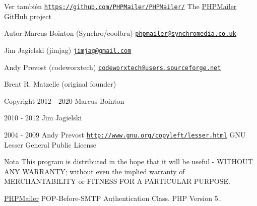 \begin{DoxySeeAlso}{Ver también}
\href{https://github.com/PHPMailer/PHPMailer/}{\tt https\+://github.\+com/\+P\+H\+P\+Mailer/\+P\+H\+P\+Mailer/} The \hyperlink{classPHPMailer_1_1PHPMailer_1_1PHPMailer}{P\+H\+P\+Mailer} Git\+Hub project
\end{DoxySeeAlso}
\begin{DoxyAuthor}{Autor}
Marcus Bointon (Synchro/coolbru) \href{mailto:phpmailer@synchromedia.co.uk}{\tt phpmailer@synchromedia.\+co.\+uk} 

Jim Jagielski (jimjag) \href{mailto:jimjag@gmail.com}{\tt jimjag@gmail.\+com} 

Andy Prevost (codeworxtech) \href{mailto:codeworxtech@users.sourceforge.net}{\tt codeworxtech@users.\+sourceforge.\+net} 

Brent R. Matzelle (original founder) 
\end{DoxyAuthor}
\begin{DoxyCopyright}{Copyright}
2012 -\/ 2020 Marcus Bointon 

2010 -\/ 2012 Jim Jagielski 

2004 -\/ 2009 Andy Prevost  \href{http://www.gnu.org/copyleft/lesser.html}{\tt http\+://www.\+gnu.\+org/copyleft/lesser.\+html} G\+NU Lesser General Public License 
\end{DoxyCopyright}
\begin{DoxyNote}{Nota}
This program is distributed in the hope that it will be useful -\/ W\+I\+T\+H\+O\+UT A\+NY W\+A\+R\+R\+A\+N\+TY; without even the implied warranty of M\+E\+R\+C\+H\+A\+N\+T\+A\+B\+I\+L\+I\+TY or F\+I\+T\+N\+E\+SS F\+OR A P\+A\+R\+T\+I\+C\+U\+L\+AR P\+U\+R\+P\+O\+SE.
\end{DoxyNote}
\hyperlink{classPHPMailer_1_1PHPMailer_1_1PHPMailer}{P\+H\+P\+Mailer} P\+O\+P-\/\+Before-\/\+S\+M\+TP Authentication Class. P\+HP Version 5..

